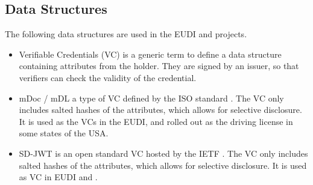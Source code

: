 \subsection{Data Structures}

The following data structures are used in the EUDI and \swiyu projects.

\begin{itemize}
    \item Verifiable Credentials (VC) is a generic term to define a data structure containing attributes from the holder. 
    They are signed by an issuer, so that verifiers can check the validity of the credential.
    \item mDoc / mDL a type of VC defined by the ISO standard \cite{ISO18013-5_2021}.
    The VC only includes salted hashes of the attributes, which allows for selective disclosure.
    It is used as the VCs in the EUDI, and rolled out as the driving license in some states of the USA.
    \item SD-JWT is an open standard VC hosted by the IETF \cite{SDJWT}.
    The VC only includes salted hashes of the attributes, which allows for selective disclosure.
    It is used as VC in EUDI and \swiyu.
\end{itemize}

